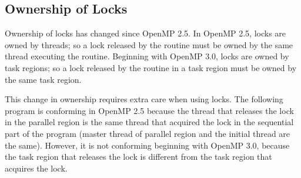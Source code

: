 \subsection{Ownership of Locks}
\label{subsec:lock_owner}

Ownership of locks has changed since OpenMP 2.5. In OpenMP 2.5, locks are owned 
by threads; so a lock released by the  routine must be 
owned by the same thread executing the routine.  Beginning with OpenMP 3.0, locks are owned 
by task regions; so a lock released by the  routine in 
a task region must be owned by the same task region.

This change in ownership requires extra care when using locks. The following program 
is conforming in OpenMP 2.5 because the thread that releases the lock  
in the parallel region is the same thread that acquired the lock in the sequential 
part of the program (master thread of parallel region and the initial thread are 
the same). However, it is not conforming beginning with OpenMP 3.0, because the task 
region that releases the lock  is different from the task region that 
acquires the lock.




